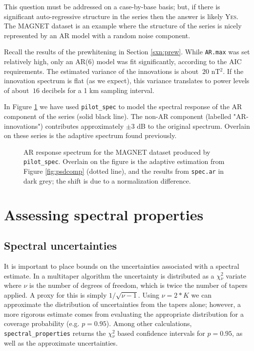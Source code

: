 \documentclass[10pt]{article}\usepackage[]{graphicx}\usepackage[]{color}
\newcommand{\SC}[1]{\textsc{#1}}
\newcommand{\Rcmd}[1]{\texttt{#1}}
\begin{document}
This question must be addressed on a case-by-base basis; but, if there
is significant auto-regressive structure in the series then
the answer is likely \SC{Yes}.  
The MAGNET dataset is an example where the structure of the series
is nicely represented by an AR model with a random noise component.

Recall the results of the prewhitening in Section \ref{sxn:prew}.
While \Rcmd{AR.max} was set relatively high,
only an AR(6) model was fit significantly, according to the AIC requirements. 
The estimated variance of the innovations is about $~20$ nT$^2$.
If the innovation spectrum
is flat (as we expect), this variance translates to power levels
of about $~16$ decibels
for a 1 km sampling interval.  



In Figure \ref{fig:arspecvar} we have used \Rcmd{pilot\_spec} to 
model the spectral response of the AR component of the series (solid
black line).
The non-AR component (labelled "AR-innovations")
contributes approximately $\pm 3$ dB to the original spectrum.
Overlain on these series is the adaptive spectrum found previously.

\begin{figure}[!htbp]
\begin{center}

\caption{AR response spectrum for the MAGNET dataset produced by 
\Rcmd{pilot\_spec}. Overlain on the figure is the adaptive estimation 
from Figure \ref{fig:psdcomp} (dotted line),
and the results from \Rcmd{spec.ar} in dark grey; the shift is due to a
normalization difference.}
\label{fig:arspecvar}
\end{center}
\end{figure}

\section{Assessing spectral properties}
\subsection{Spectral uncertainties}
It is important to place bounds on the uncertainties associated
with a spectral estimate.
In a multitaper algorithm the uncertainty is distributed as
a $\chi{}_{\nu}^2$ variate where $\nu$ is
the number of degrees of freedom, which is twice the
number of tapers applied.
A proxy for this is simply $1/\sqrt{\nu - 1}$.
Using $\nu = 2*K$ we can approximate the distribution
of uncertainties from the tapers alone; however, a more
rigorous estimate comes from evaluating the appropriate 
distribution  for a coverage probability (e.g. $p=0.95$).
Among other calculations, \Rcmd{spectral\_properties} returns the 
$\chi{}_{\nu}^2$ based confidence intervals for $p=0.95$, as well as the
approximate uncertainties.  
\end{document}
